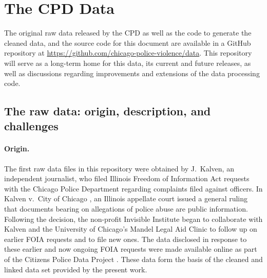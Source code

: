 \section{The CPD Data} \label{sec:data}

The original raw data released by the CPD as well as the code to generate the
cleaned data, and the source code for this document are available in a GitHub
repository at \url{https://github.com/chicago-police-violence/data}. This
repository will serve as a long-term home for this data, its current and future
releases, as well as discussions regarding improvements and extensions of the
data processing code.



\subsection{The raw data: origin, description, and challenges}
\label{sec:raw}

\paragraph{Origin.}
The first raw data files in this repository were obtained by J.~Kalven, an 
independent journalist, who filed Illinois Freedom of Information Act requests with 
the Chicago Police Department regarding complaints filed against officers. 
In Kalven v.~City of Chicago \cite{kalven2014}, an Illinois appellate court issued
a general ruling that documents bearing on allegations of
police abuse are public information. Following 
the decision, the non-profit
Invisible Institute began to collaborate with Kalven 
and the University of Chicago's Mandel Legal Aid
Clinic to follow up on earlier FOIA requests and to file new ones. The data
disclosed in response to these earlier and now ongoing FOIA requests were made available
online as part of the Citizens Police Data Project \cite{cpdp}.
These data form the basis of the cleaned and linked data set provided by the present work.

